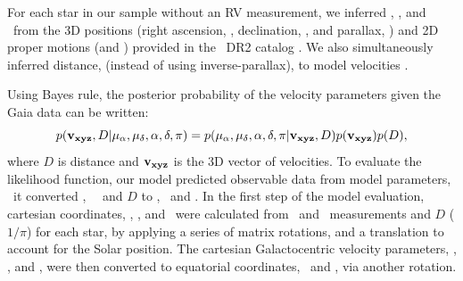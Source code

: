 For each star in our sample without an RV measurement, we inferred \vx, \vy,
and \vz\ from the 3D positions (right ascension, \ra, declination, \dec, and
parallax, \parallax) and 2D proper motions (\mura and \mudec) provided in the
\gaia\ DR2 catalog \citep{brown2011}.
We also simultaneously inferred distance, (instead of using inverse-parallax),
to model velocities \citep[see \eg][]{bailer-jones2015, bailer-jones2018}.

Using Bayes rule, the posterior probability of the velocity parameters given
the Gaia data can be written:
\begin{equation}
    p({\bf v_{xyz}}, D | \mu_{\alpha}, \mu_{\delta}, \alpha, \delta, \pi) =
    p(\mu_{\alpha}, \mu_{\delta}, \alpha, \delta, \pi | {\bf v_{xyz}}, D)
    p({\bf v_{xyz}}) p(D),
\end{equation}
where $D$ is distance and ${\bf v_{xyz}}$ is the 3D vector of velocities.
To evaluate the likelihood function, our model predicted observable data from
model parameters, \ie\ it converted \vx, \vy\, \vz\ and $D$ to \pmra, \pmdec\
and \parallax.
In the first step of the model evaluation, cartesian coordinates, \x, \y, and
\z\, were calculated from \ra\ and \dec\ measurements and $D$ ($1/\pi$) for
each star, by applying a series of matrix rotations, and a translation to
account for the Solar position.  The cartesian Galactocentric velocity
parameters, \vx, \vy, and \vz, were then converted to equatorial coordinates,
\pmra\ and \pmdec, via another rotation.

